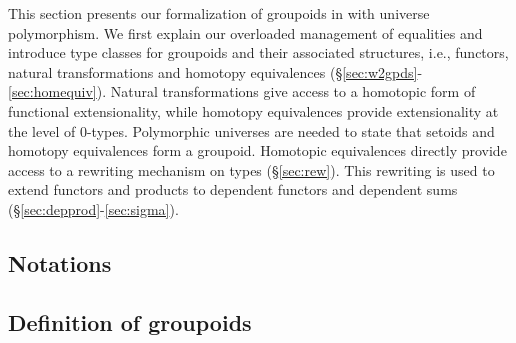 
\begin{coqdoccode}
\end{coqdoccode}
  This section presents our formalization of groupoids in \Coq with
  universe polymorphism. 
  We first explain our overloaded management of
  equalities and introduce type classes for groupoids and their
  associated structures, i.e., functors, natural transformations and
  homotopy equivalences
  (\S\ref{sec:w2gpds}-\ref{sec:homequiv}).
  Natural transformations give access to a homotopic form of
  functional extensionality, while homotopy equivalences provide
  extensionality at the level of 0-types.  Polymorphic universes are
  needed to state that setoids and homotopy equivalences form a
  groupoid.  Homotopic equivalences directly provide access to a
  rewriting mechanism on types (\S\ref{sec:rew}). This rewriting is
  used to extend functors and products to dependent functors and
  dependent sums (\S\ref{sec:depprod}-\ref{sec:sigma}).
 \subsection{Notations} 


\subsection{Definition of groupoids \label{sec:w2gpds}}




